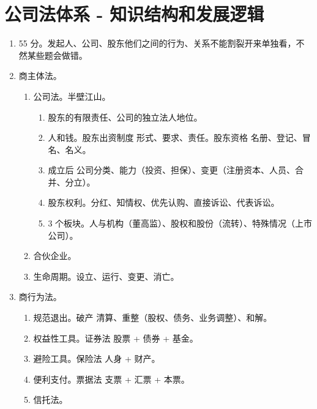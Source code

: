 \section{公司法体系 - 知识结构和发展逻辑}
\begin{enumerate}
  \item 55 分。发起人、公司、股东他们之间的行为、关系不能割裂开来单独看，不然某些题会做错。
  \item 商主体法。
        \begin{enumerate}
          \item 公司法。半壁江山。
                \begin{enumerate}
                  \item 股东的有限责任、公司的独立法人地位。
                  \item 人和钱。股东出资制度 \yjt 形式、要求、责任。股东资格 \yjt 名册、登记、冒名、名义。
                  \item 成立后 \yjt 公司分类、能力（投资、担保）、变更（注册资本、人员、合并、分立）。
                  \item 股东权利。分红、知情权、优先认购、直接诉讼、代表诉讼。
                  \item 3 个板块。人与机构（董高监）、股权和股份（流转）、特殊情况（上市公司）。
                \end{enumerate}
          \item 合伙企业。
          \item 生命周期。设立、运行、变更、消亡。
        \end{enumerate}
  \item 商行为法。
        \begin{enumerate}
          \item 规范退出。破产 \yjt 清算、重整（股权、债务、业务调整）、和解。
          \item 权益性工具。证券法 \yjt 股票 + 债券 + 基金。
          \item 避险工具。保险法 \yjt 人身 + 财产。
          \item 便利支付。票据法 \yjt 支票 + 汇票 + 本票。
          \item 信托法。
        \end{enumerate}
\end{enumerate}
